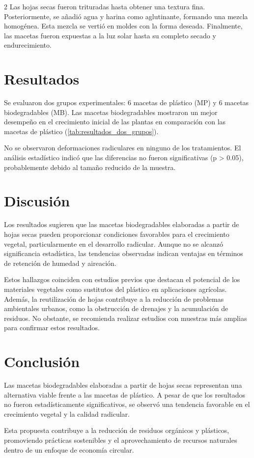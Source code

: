 \begin{multicols}{2}
Las hojas secas fueron trituradas hasta obtener una textura fina. Posteriormente, se añadió agua y harina como aglutinante, formando una mezcla homogénea. Esta mezcla se vertió en moldes con la forma deseada. Finalmente, las macetas fueron expuestas a la luz solar hasta su completo secado y endurecimiento.

\section{Resultados}

Se evaluaron dos grupos experimentales: 6 macetas de plástico (MP) y 6 macetas biodegradables (MB). Las macetas biodegradables mostraron un mejor desempeño en el crecimiento inicial de las plantas en comparación con las macetas de plástico (\autoref{tab:resultados_dos_grupos}).

    

No se observaron deformaciones radiculares en ninguno de los tratamientos. El análisis estadístico indicó que las diferencias no fueron significativas (p > 0.05), probablemente debido al tamaño reducido de la muestra.

\section{Discusión}

Los resultados sugieren que las macetas biodegradables elaboradas a partir de hojas secas pueden proporcionar condiciones favorables para el crecimiento vegetal, particularmente en el desarrollo radicular. Aunque no se alcanzó significancia estadística, las tendencias observadas indican ventajas en términos de retención de humedad y aireación.

Estos hallazgos coinciden con estudios previos que destacan el potencial de los materiales vegetales como sustitutos del plástico en aplicaciones agrícolas. Además, la reutilización de hojas contribuye a la reducción de problemas ambientales urbanos, como la obstrucción de drenajes y la acumulación de residuos.
No obstante, se recomienda realizar estudios con muestras más amplias para confirmar estos resultados.

\section{Conclusión}

Las macetas biodegradables elaboradas a partir de hojas secas representan una alternativa viable frente a las macetas de plástico. A pesar de que los resultados no fueron estadísticamente significativos, se observó una tendencia favorable en el crecimiento vegetal y la calidad radicular.

Esta propuesta contribuye a la reducción de residuos orgánicos y plásticos, promoviendo prácticas sostenibles y el aprovechamiento de recursos naturales dentro de un enfoque de economía circular.






\end{multicols}